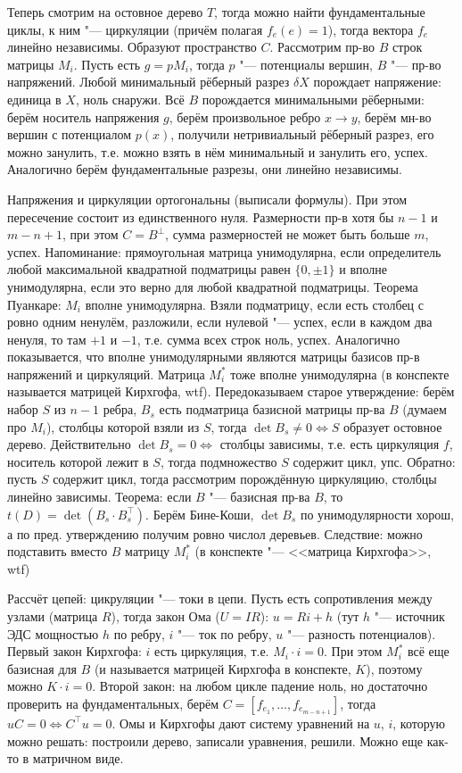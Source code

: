Теперь смотрим на остовное дерево $T$, тогда можно найти фундаментальные циклы,
к ним "--- циркуляции (причём полагая $f_e(e)=1$), тогда вектора $f_e$ линейно независимы.
Образуют пространство $C$.
Рассмотрим пр-во $B$ строк матрицы $M_i$.
Пусть есть $g=pM_i$, тогда $p$ "--- потенциалы вершин, $B$ "--- пр-во напряжений.
Любой минимальный рёберный разрез $\delta X$ порождает напряжение: единица в $X$, ноль снаружи.
Всё $B$ порождается минимальными рёберными: берём носитель напряжения $g$,
берём произвольное ребро $x\to y$, берём мн-во вершин с потенциалом $p(x)$, получили нетривиальный
рёберный разрез, его можно занулить, т.е. можно взять в нём минимальный и занулить его, успех.
Аналогично берём фундаментальные разрезы, они линейно независимы.

Напряжения и циркуляции ортогональны (выписали формулы).
При этом пересечение состоит из единственного нуля.
Размерности пр-в хотя бы $n-1$ и $m-n+1$, при этом $C=B^\bot$, сумма размерностей не может быть больше $m$, успех.
Напоминание: прямоугольная матрица унимодулярна, если определитель любой максимальной квадратной подматрицы равен $\{0,\pm1\}$
и вполне унимодулярна, если это верно для любой квадратной подматрицы.
Теорема Пуанкаре: $M_i$ вполне унимодулярна.
Взяли подматрицу, если есть столбец с ровно одним ненулём, разложили,
если нулевой "--- успех, если в каждом два ненуля, то там $+1$ и $-1$, т.е. сумма всех строк ноль, успех.
Аналогично показывается, что вполне унимодулярными являются матрицы базисов пр-в напряжений и циркуляций.
Матрица $M_i^*$ тоже вполне унимодулярна (в конспекте называется матрицей Кирхгофа, wtf).
Передоказываем старое утверждение: берём набор $S$ из $n-1$ ребра, $B_s$ есть подматрица
базисной матрицы пр-ва $B$ (думаем про $M_i$), столбцы которой взяли из $S$, тогда
$\det B_s \neq 0 \iff S$ образует остовное дерево.
Действительно $\det B_s = 0 \iff$ столбцы зависимы, т.е. есть циркуляция $f$,
носитель которой лежит в $S$, тогда подмножество $S$ содержит цикл, упс.
Обратно: пусть $S$ содержит цикл, тогда рассмотрим порождённую циркуляцию, столбцы
линейно зависимы.
Теорема: если $B$ "--- базисная пр-ва $B$, то $t(D)=\det(B_s \cdot B_s ^\top)$.
Берём Бине-Коши, $\det B_s$ по унимодулярности хорош, а по пред. утверждению получим ровно числол деревьев.
Следствие: можно подставить вместо $B$ матрицу $M_i^*$ (в конспекте "--- <<матрица Кирхгофа>>, wtf)

Рассчёт цепей: цикруляции "--- токи в цепи.
Пусть есть сопротивления между узлами (матрица $R$), тогда закон Ома ($U=IR$): $u=Ri+h$ (тут $h$ "--- источник
ЭДС мощностью $h$ по ребру, $i$ "--- ток по ребру, $u$ "--- разность потенциалов).
Первый закон Кирхгофа: $i$ есть циркуляция, т.е. $M_i\cdot i = 0$.
При этом $M_i^*$ всё еще базисная для $B$ (и называется матрицей Кирхгофа в конспекте, $K$), поэтому можно $K\cdot i = 0$.
Второй закон: на любом цикле падение ноль, но достаточно проверить на фундаментальных, берём $C=[f_{e_1}, \dots, f_{e_{m-n+1}}]$, тогда
$uC=0 \iff C^\top u=0$.
Омы и Кирхгофы дают систему уравнений на $u$, $i$, которую можно решать: построили дерево, записали уравнения, решили.
Можно еще как-то в матричном виде.
